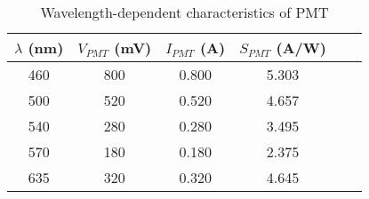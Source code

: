 \begin{table}[H]
    \centering
    \begin{tabular}{|c|c|c|c|c|c|}
    \hline
    $\lambda$ (nm) & $V_{PMT}$ (mV) & $I_{PMT}$ (A) & $ S_{PMT}$ (A/W) \\ \hline
    460 & 800 & 0.800 & 5.303 \\
    500 & 520 & 0.520 & 4.657 \\
    540 & 280 & 0.280 & 3.495 \\
    570 & 180 & 0.180 & 2.375 \\
    635 & 320 & 0.320 & 4.645 \\ \hline

    \end{tabular}
\caption{Wavelength-dependent characteristics of PMT}
\end{table}